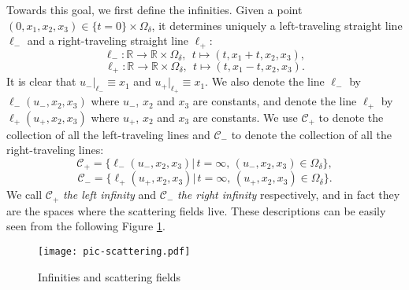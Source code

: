 \documentclass[10pt,reqno]{amsart}
\numberwithin{equation}{section}
\begin{document}
Towards this goal, we first define the  infinities. 
Given a point $(0, x_1,x_2,x_3) \in \{t=0\}\times\Omega_\delta$, it determines uniquely a left-traveling straight line $\ell_-$ and a right-traveling straight line $\ell_+$: 
\[\ell_-: \mathbb{R}\rightarrow \mathbb{R}\times \Omega_\delta, \ \ t\mapsto (t,x_1+t,x_2,x_3),\]
\[\ell_+: \mathbb{R}\rightarrow \mathbb{R}\times \Omega_\delta, \ \ t\mapsto (t,x_1-t,x_2,x_3).\]
It is clear that  $u_-\big|_{\ell_-}\equiv x_1$ and $u_+\big|_{\ell_+}\equiv x_1$. We also denote the line $\ell_-$ by $\ell_-(u_-,x_2,x_3)$  where $u_-$, $x_2$ and $x_3$ are constants, and denote the line $\ell_+$ by $\ell_+(u_+,x_2,x_3)$  where $u_+$, $x_2$ and $x_3$ are constants. 
We use $\mathcal{C}_+$ to denote the collection of all the left-traveling lines and $\mathcal{C}_-$ to denote the collection of all the right-traveling lines:
\[\mathcal{C}_+=\big\{\ell_-(u_-,x_2,x_3)\big|\,t=\infty,\, (u_-,x_2,x_3)\in \Omega_\delta\big\},\] 
\[\mathcal{C}_-=\big\{\ell_+(u_+,x_2,x_3)\big|\,t=\infty,\, (u_+,x_2,x_3)\in \Omega_\delta\big\}.\] 
We call $\mathcal{C}_+$ \emph{the left infinity} and  $\mathcal{C}_-$ \emph{the right infinity} respectively, and in fact they are the spaces where the scattering fields live. 
These descriptions can be easily seen from the following Figure \ref{fig:scattering}.

	\begin{figure}[ht]
			\vspace{-0.1cm}
	\centering
	\texttt{[image: pic-scattering.pdf]}
	\vspace{-0.1cm}
	\caption{Infinities and scattering fields}
	\label{fig:scattering}
		\vspace{-0.1cm}
\end{figure}
 
\end{document}
